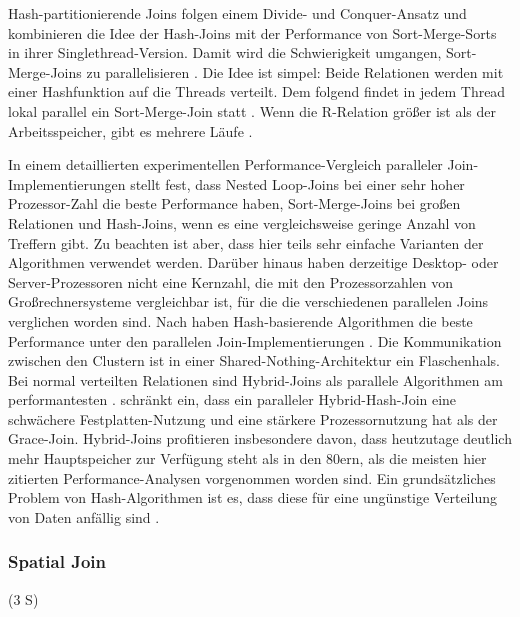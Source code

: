\documentclass[a4paper,12pt,twoside]{article}
\begin{document}
{Hash-partitionierende Joins folgen einem Divide- und Conquer-Ansatz und kombinieren die Idee der Hash-Joins mit der Performance von Sort-Merge-Sorts in ihrer Singlethread-Version. Damit wird die Schwierigkeit umgangen, Sort-Merge-Joins zu parallelisieren \parencite[S. 75ff]{Mishra199}. Die Idee ist simpel: Beide Relationen werden mit einer Hashfunktion auf die Threads verteilt. Dem folgend findet in jedem Thread lokal parallel ein Sort-Merge-Join statt \parencite{Richardson1987}. Wenn die R-Relation größer ist als der Arbeitsspeicher, gibt es mehrere Läufe \parencite{Lu1990}.

In einem detaillierten experimentellen Performance-Vergleich paralleler Join-Implementierungen stellt {\textcite{Valduriez1984}} fest, dass Nested Loop-Joins bei einer sehr hoher Prozessor-Zahl die beste Performance haben, Sort-Merge-Joins bei großen Relationen und Hash-Joins, wenn es eine vergleichsweise geringe Anzahl von Treffern gibt. Zu beachten ist aber, dass hier teils sehr einfache Varianten der Algorithmen verwendet werden. Darüber hinaus haben derzeitige Desktop- oder Server-Prozessoren nicht eine Kernzahl, die mit den Prozessorzahlen von Großrechnersysteme vergleichbar ist, für die die verschiedenen parallelen Joins verglichen worden sind. Nach {\textcite{Richardson1987}} haben Hash-basierende Algorithmen die beste Performance unter den parallelen Join-Implementierungen \parencite[vgl. auch ]{Gerber1986}. Die Kommunikation zwischen den Clustern ist in einer Shared-Nothing-Architektur ein Flaschenhals. Bei normal verteilten Relationen sind Hybrid-Joins als parallele Algorithmen am performantesten \parencite{Schneider1989}. {\textcite{DeWitt1985}} schränkt ein, dass ein paralleler Hybrid-Hash-Join eine schwächere Festplatten-Nutzung und eine stärkere Prozessornutzung hat als der Grace-Join. Hybrid-Joins profitieren insbesondere davon, dass heutzutage deutlich mehr Hauptspeicher zur Verfügung steht als in den 80ern, als die meisten hier zitierten Performance-Analysen vorgenommen worden sind. Ein grundsätzliches Problem von Hash-Algorithmen ist es, dass diese für eine ungünstige Verteilung von Daten anfällig sind \parencite{Lakshmi1990}.

\subsubsection{Spatial Join} (3  S)
\label{Spatial Join} 

}
\end{document}
